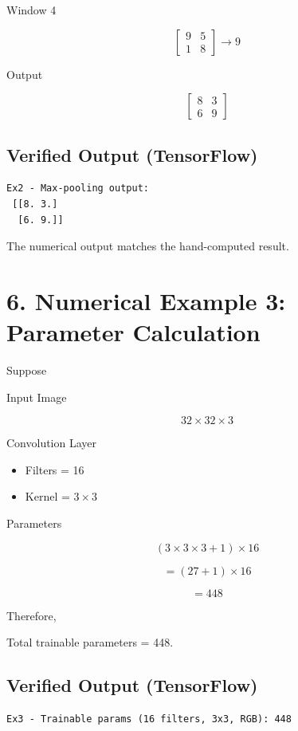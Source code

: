 \documentclass[11pt]{article}
\begin{document}
Window 4

\[
\begin{bmatrix}
9&5\\
1&8
\end{bmatrix}
\rightarrow9
\]

Output

\[
\begin{bmatrix}
8&3\\
6&9
\end{bmatrix}
\]

\subsection*{Verified Output (TensorFlow)}

\begin{verbatim}
Ex2 - Max-pooling output:
 [[8. 3.]
  [6. 9.]]
\end{verbatim}

The numerical output matches the hand-computed result.

\section*{6. Numerical Example 3: Parameter Calculation}

Suppose

Input Image

\[
32\times32\times3
\]

Convolution Layer

\begin{itemize}
\item Filters = 16
\item Kernel = $3\times3$
\end{itemize}

Parameters

\[
(3\times3\times3+1)\times16
\]

\[
=(27+1)\times16
\]

\[
=448
\]

Therefore,

Total trainable parameters = 448.

\subsection*{Verified Output (TensorFlow)}

\begin{verbatim}
Ex3 - Trainable params (16 filters, 3x3, RGB): 448
\end{verbatim}
\end{document}

